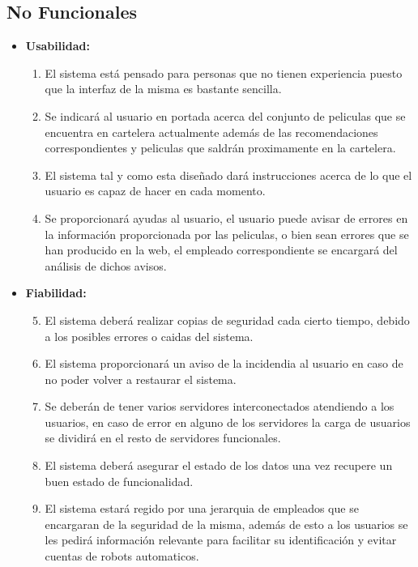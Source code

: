 \documentclass{article}
\begin{document}
	    
    \subsection{No Funcionales}
    \begin{itemize}
    \item \textbf{Usabilidad:}
        \begin{enumerate}[label=\bfseries RNF- \arabic*:]
        \item El sistema está pensado para personas que no tienen experiencia puesto que la interfaz de la misma es bastante sencilla.
        \item Se indicará al usuario en portada acerca del conjunto de peliculas que se encuentra en cartelera actualmente además de las recomendaciones correspondientes y peliculas que saldrán proximamente en la cartelera.
        \item El sistema tal y como esta diseñado dará instrucciones acerca de lo que el usuario es capaz de hacer en cada momento.
        \item Se proporcionará ayudas al usuario, el usuario puede avisar de errores en la información proporcionada por las peliculas, o bien sean errores que se han producido en la web, el empleado correspondiente se encargará del análisis de dichos avisos. 
        \end{enumerate}
        
    \item \textbf{Fiabilidad:}
        \begin{enumerate}[label=\bfseries RNF- \arabic*:]
        \setcounter{enumi}{4}
        \item El sistema deberá realizar copias de seguridad cada cierto tiempo, debido a los posibles errores o caidas del sistema.
        \item El sistema proporcionará un aviso de la incidendia al usuario en caso de no poder volver a restaurar el sistema.
        \item Se deberán de tener varios servidores interconectados atendiendo a los usuarios, en caso de error en alguno de los servidores la carga de usuarios se dividirá en el resto de servidores funcionales.
        \item El sistema deberá asegurar el estado de los datos una vez recupere un buen estado de funcionalidad.
        \item El sistema estará regido por una jerarquia de empleados que se encargaran de la seguridad de la misma, además de esto a los usuarios se les pedirá información relevante para facilitar su identificación y evitar cuentas de robots automaticos. 
        \end{enumerate}
        

\end{itemize}
\end{document}
